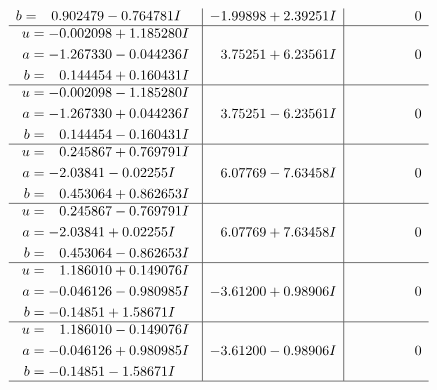 \documentclass[1p]{elsarticle_modified}
\theoremstyle{definition}
\begin{document}
$$\begin{array}{c|c|c}
\begin{aligned}
b &= \phantom{-}0.902479 - 0.764781 I\end{aligned}
 & -1.99898 + 2.39251 I & \phantom{-0.000000 } 0 \\ \hline\begin{aligned}
u &= -0.002098 + 1.185280 I \\
a &= -1.267330 - 0.044236 I \\
b &= \phantom{-}0.144454 + 0.160431 I\end{aligned}
 & \phantom{-}3.75251 + 6.23561 I & \phantom{-0.000000 } 0 \\ \hline\begin{aligned}
u &= -0.002098 - 1.185280 I \\
a &= -1.267330 + 0.044236 I \\
b &= \phantom{-}0.144454 - 0.160431 I\end{aligned}
 & \phantom{-}3.75251 - 6.23561 I & \phantom{-0.000000 } 0 \\ \hline\begin{aligned}
u &= \phantom{-}0.245867 + 0.769791 I \\
a &= -2.03841 - 0.02255 I \\
b &= \phantom{-}0.453064 + 0.862653 I\end{aligned}
 & \phantom{-}6.07769 - 7.63458 I & \phantom{-0.000000 } 0 \\ \hline\begin{aligned}
u &= \phantom{-}0.245867 - 0.769791 I \\
a &= -2.03841 + 0.02255 I \\
b &= \phantom{-}0.453064 - 0.862653 I\end{aligned}
 & \phantom{-}6.07769 + 7.63458 I & \phantom{-0.000000 } 0 \\ \hline\begin{aligned}
u &= \phantom{-}1.186010 + 0.149076 I \\
a &= -0.046126 - 0.980985 I \\
b &= -0.14851 + 1.58671 I\end{aligned}
 & -3.61200 + 0.98906 I & \phantom{-0.000000 } 0 \\ \hline\begin{aligned}
u &= \phantom{-}1.186010 - 0.149076 I \\
a &= -0.046126 + 0.980985 I \\
b &= -0.14851 - 1.58671 I\end{aligned}
 & -3.61200 - 0.98906 I & \phantom{-0.000000 } 0\\
 \hline 
 \end{array}$$\newpage$$\begin{array}{c|c|c}  

\end{array}$$
\end{document}
